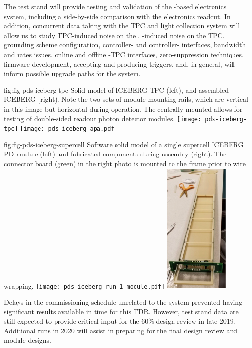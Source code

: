 The test stand will provide testing and validation of the  -based electronics system, including a side-by-side comparison with the   electronics readout. In addition, concurrent data taking with the TPC and light collection system will allow us to study TPC-induced noise on the , -induced noise on the TPC, grounding scheme configuration, controller- and controller- interfaces, bandwidth and rates issues, online and offline -TPC interfaces, zero-suppression techniques, firmware development, accepting and producing triggers, and, in general, will inform possible upgrade paths for the system. 


\begin{dunefigure}
 {fig:fig-pds-iceberg-tpc}
 {Solid model of ICEBERG TPC (left), and assembled ICEBERG  (right).  Note the two sets of  module mounting rails, which are vertical in this image but horizontal during operation. The centrally-mounted  allows for testing of double-sided readout photon detector modules.}
\texttt{[image: pds-iceberg-tpc]}
\texttt{[image: pds-iceberg-apa.pdf]}
\end{dunefigure}

\begin{dunefigure}
 {fig:fig-pds-iceberg-supercell}
 {Software solid model of a single supercell ICEBERG PD module (left) and fabricated components during assembly (right).  The connector board (green) in the right photo is mounted to the  frame prior to wire wrapping.}
\texttt{[image: pds-iceberg-run-1-module.pdf]}
\includegraphics[angle=0,height=6.5cm]{graphics/pds-iceberg-module-assembly-photo.pdf}
\end{dunefigure}

Delays in the  commissioning schedule unrelated to the  system prevented having significant results available in time for this TDR. However, test stand data are still expected to provide critical input for the 60\% design review in late 2019. Additional runs in 2020 will assist in preparing for the final design review and  module designs.


